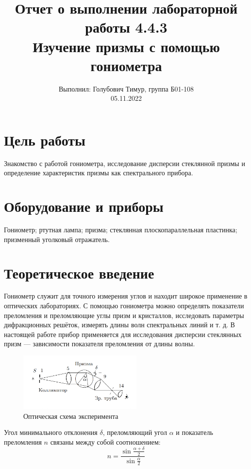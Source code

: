\documentclass[12pt,a4paper]{article}
\author{\normalsize Выполнил: Голубович Тимур, группа Б01-108 \\
    	\normalsize 05.11.2022}
\date{}
\title{
    	\large Отчет о выполнении лабораторной работы 4.4.3 \\
    	\Large Изучение призмы с помощью гониометра\\ 
    }
\begin{document}
    	\maketitle
    	
    \section*{Цель работы}
    Знакомство с работой гониометра, исследование дисперсии стеклянной призмы и определение характеристик призмы как спектрального прибора.
    
    
    \section*{Оборудование и приборы} 
    Гониометр;
    ртутная лампа;
    призма;
    стеклянная плоскопараллельная пластинка;
    призменный уголковый отражатель.

	
	\section*{Теоретическое введение} 

	Гониометр служит для точного измерения углов и находит широкое применение в оптических лабораториях. С помощью гониометра можно определять показатели преломления и преломляющие углы призм и кристаллов, исследовать параметры дифракционных решёток, измерять длины волн спектральных линий и т. д. В настоящей работе прибор применяется для исследования дисперсии стеклянных призм — зависимости показателя преломления от длины волны.

 	\begin{figure}[h]
		\begin{center}
			\includegraphics[width = 0.55\textwidth]{res/scheme.png}
			\caption{Оптическая схема эксперимента}
		\end{center}
	\end{figure}
	
	Угол минимального отклонения $\delta$, преломляющий угол $\alpha$ и показатель преломления $n$ связаны между собой соотношением:
	\begin{equation}
		n = \frac{\sin{\frac{\alpha + \delta}{2}}}{\sin{\frac{\alpha}{2}}}
        \label{eq:1}
	\end{equation}
\end{document}
